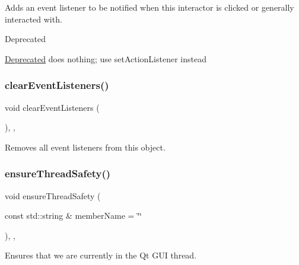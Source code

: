 Adds an event listener to be notified when this interactor is clicked or generally interacted with. 

\begin{DoxyRefDesc}{Deprecated}
\item[\mbox{\hyperlink{deprecated__deprecated000006}{Deprecated}}]does nothing; use set\+Action\+Listener instead \end{DoxyRefDesc}
\mbox{\label{classGObservable_a80cfa040459ff53594adbd6a51ec8f43}} 
\subsubsection{\texorpdfstring{clear\+Event\+Listeners()}{clearEventListeners()}}
{\footnotesize\ttfamily void clear\+Event\+Listeners (\begin{DoxyParamCaption}{ }\end{DoxyParamCaption})\hspace{0.3cm}{\ttfamily [protected]}, {\ttfamily [virtual]}, {\ttfamily [inherited]}}



Removes all event listeners from this object. 

\mbox{\label{classGObservable_a284f31528c0520f8e545c03ac9eeac74}} 
\subsubsection{\texorpdfstring{ensure\+Thread\+Safety()}{ensureThreadSafety()}}
{\footnotesize\ttfamily void ensure\+Thread\+Safety (\begin{DoxyParamCaption}\item[{const std\+::string \&}]{member\+Name = {\ttfamily \char`\"{}\char`\"{}} }\end{DoxyParamCaption})\hspace{0.3cm}{\ttfamily [protected]}, {\ttfamily [virtual]}, {\ttfamily [inherited]}}



Ensures that we are currently in the Qt G\+UI thread. 

